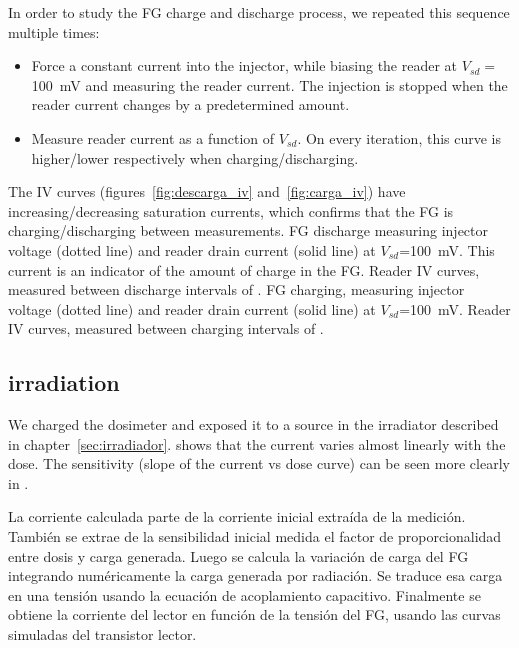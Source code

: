 In order to study the FG charge and discharge process,
we repeated this sequence multiple times:
\begin{itemize}
    \item Force a constant current into the injector,
        while biasing the reader at $V_{sd}=$\SI{100}{\milli\volt}
        and measuring the reader current.
        The injection is stopped when the reader current changes by a predetermined amount.
    \item Measure reader current as a function of $V_{sd}$.
        On every iteration, this curve is higher/lower respectively when charging/discharging.
\end{itemize}

The IV curves (figures~\ref{fig:descarga_iv}
and~\ref{fig:carga_iv}) have increasing/decreasing saturation currents,
which confirms that the FG is charging/discharging
between measurements.
{FG discharge measuring injector voltage (dotted line) and
reader drain current (solid line) at
$V_{sd}$=\SI{100}{\milli\volt}.
This current is an indicator of the amount of charge in the FG.}
{Reader IV curves, measured between discharge intervals of
    .}
{FG charging, measuring injector voltage (dotted line) and
reader drain current (solid line) at
$V_{sd}$=\SI{100}{\milli\volt}.}
{Reader IV curves, measured between charging intervals of
    .}
\subsection{\Strontium irradiation}
We charged the dosimeter and exposed it to a 
\Strontium source
in the irradiator described in chapter~\ref{sec:irradiador}.
 shows that the current
varies almost linearly with the dose.
The sensitivity (slope of the current vs dose curve)
can be seen more clearly in
.

La corriente calculada parte de la corriente inicial extraída de la medición.
También se extrae de la sensibilidad inicial medida el factor de proporcionalidad entre dosis y carga generada.
Luego se calcula la variación de carga del FG
integrando numéricamente la carga generada por radiación.
Se traduce esa carga en una tensión
usando la ecuación de acoplamiento capacitivo.
Finalmente se obtiene la corriente del lector
en función de la tensión del FG,
usando las curvas simuladas del transistor lector.

